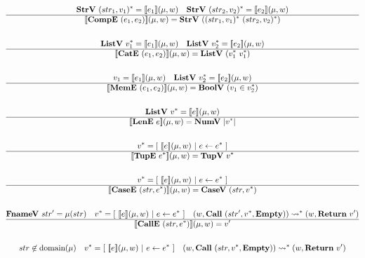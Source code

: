 \begin{gather*}
  \strv ~ \seq{(str_1, v_1)} = \sem{e_1}(\mu, w) \quad
  \strv ~ \seq{(str_2, v_2)} = \sem{e_2}(\mu, w) \\
  \hline
  \sem{\compe ~ (e_1, e_2)}(\mu, w) = \strv ~ (\seq{(str_1, v_1)} ~ \seq{(str_2, v_2)}) \\
%
\newline \\
  \listv ~ \seq{v_1} = \sem{e_1}(\mu, w) \quad
  \listv ~ \seq{v_2} = \sem{e_2}(\mu, w) \\
  \hline
  \sem{\cate ~ (e_1, e_2)}(\mu, w) = \listv ~ (\seq{v_1} ~ \seq{v_1}) \\
%
\newline \\
  v_1 = \sem{e_1}(\mu, w) \quad
  \listv ~ \seq{v_2} = \sem{e_2}(\mu, w) \\
  \hline
  \sem{\meme ~ (e_1, e_2)}(\mu, w) = \boolv ~ (v_1 \in \seq{v_2}) \\
%
\newline \\
  \listv ~ \seq{v} = \sem{e}(\mu, w) \\
  \hline
  \sem{\lene ~ e}(\mu, w) = \numv ~ |\seq v| \\
%
\newline \\
  \seq{v} = [ ~ \sem{e}(\mu, w) ~ | ~ e \leftarrow \seq e ~ ] \\
  \hline
  \sem{\tupe ~ \seq{e}}(\mu, w) = \tupv ~ \seq{v} \\
%
\newline \\
  \seq{v} = [ ~ \sem{e}(\mu, w) ~ | ~ e \leftarrow \seq e ~ ] \\
  \hline
  \sem{\casee ~ (str, \seq{e})}(\mu, w) = \casev ~ (str, \seq{v}) \\
%
\newline \\
  \fnamev ~ str' = \mu(str) \quad
  \seq{v} = [ ~ \sem{e}(\mu, w) ~ | ~ e \leftarrow \seq e ~ ] \quad
  (w, \call ~ (str', \seq v, \mt)) \seq{\leadsto} (w, \ret ~ v') \\
  \hline
  \sem{\calle ~ (str, \seq{e})}(\mu, w) = v' \\
%
\newline \\
  str \not\in \domain(\mu) \quad
  \seq{v} = [ ~ \sem{e}(\mu, w) ~ | ~ e \leftarrow \seq e ~ ] \quad
  (w, \call ~ (str, \seq v, \mt)) \seq{\leadsto} (w, \ret ~ v') \\

\end{gather*}
